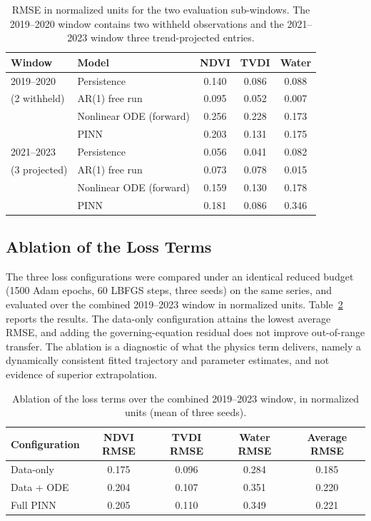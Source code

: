 \documentclass[12pt,a4paper]{article}
\begin{document}
\begin{table}[H]
	\centering
	\caption{RMSE in normalized units for the two evaluation sub-windows. The 2019--2020 window contains two withheld observations and the 2021--2023 window three trend-projected entries.}
	\label{tab:s7_full_holdout}
	\small
	\begin{tabular}{llccc}
		\toprule
		Window & Model & NDVI & TVDI & Water \\
        \midrule
        2019--2020 & Persistence & 0.140 & 0.086 & 0.088 \\
        (2 withheld) & AR(1) free run & 0.095 & 0.052 & 0.007 \\
        & Nonlinear ODE (forward) & 0.256 & 0.228 & 0.173 \\
        & PINN & 0.203 & 0.131 & 0.175 \\
        \midrule
        2021--2023 & Persistence & 0.056 & 0.041 & 0.082 \\
        (3 projected) & AR(1) free run & 0.073 & 0.078 & 0.015 \\
        & Nonlinear ODE (forward) & 0.159 & 0.130 & 0.178 \\
        & PINN & 0.181 & 0.086 & 0.346 \\
        \bottomrule
	\end{tabular}
\end{table}

\subsection{Ablation of the Loss Terms}

The three loss configurations were compared under an identical reduced budget (1500 Adam epochs, 60 LBFGS steps, three seeds) on the same series, and evaluated over the combined 2019--2023 window in normalized units. Table~\ref{tab:s7_ablation} reports the results. The data-only configuration attains the lowest average RMSE, and adding the governing-equation residual does not improve out-of-range transfer. The ablation is a diagnostic of what the physics term delivers, namely a dynamically consistent fitted trajectory and parameter estimates, and not evidence of superior extrapolation.

\begin{table}[H]
	\centering
	\caption{Ablation of the loss terms over the combined 2019--2023 window, in normalized units (mean of three seeds).}
	\label{tab:s7_ablation}
	\small
	\begin{tabular}{lcccc}
		\toprule
		Configuration & NDVI RMSE & TVDI RMSE & Water RMSE & Average RMSE \\
		\midrule
		Data-only & 0.175 & 0.096 & 0.284 & 0.185 \\
		Data + ODE & 0.204 & 0.107 & 0.351 & 0.220 \\
		Full PINN & 0.205 & 0.110 & 0.349 & 0.221 \\
		\bottomrule
	\end{tabular}
\end{table}
\end{document}

